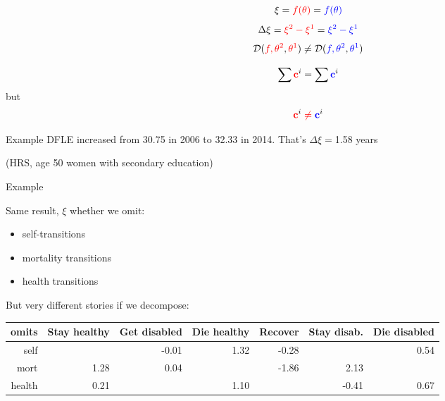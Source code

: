 \documentclass[20pt,usenames,dvipsnames]{beamer}
\begin{document}

\begin{frame}[plain]
\Large
$$\xi = \color{red}{f(\theta)} \color{black} = \color{blue}{f(\theta)}$$
\pause
$$ \Delta \xi = \color{red}{\xi^2 - \xi^1} \color{black} = \color{blue}{\xi^2 - \xi^1}$$
\pause
$$ \mathcal{D}(\color{red}{f}, \color{red}{\theta^2}\color{black},\color{red}{\theta^1}\color{black}) \ne \mathcal{D}(\color{blue}{f}, \color{blue}{\theta^2}\color{black},\color{blue}{\theta^1}\color{black})$$

$$ \sum \color{red}{\mathbf{c}}^{\color{black}i}\color{black} =\sum \color{blue}{\mathbf{c}}^{\color{black}i} $$
but
$$
\color{red}{\mathbf{c}}^{\color{black}i} \ne \color{blue}{\mathbf{c}}^{\color{black}i}$$
\end{frame}


\begin{frame}[plain]{Example}
\Large
DFLE increased from 30.75 in 2006 to 32.33 in 2014.
That's $\Delta \xi = $1.58 years

\bigskip
\bigskip
\small (HRS, age 50 women with secondary education)

\end{frame}

\begin{frame}[plain]{Example}

\Large
Same result, $\xi$  whether we omit:

\begin{itemize}
\item self-transitions
\item mortality transitions
\item health transitions
\end{itemize}

But very different stories if we decompose:

\normalsize
\begin{table}[ht]
\centering
\begin{tabular}{r|rrrrrr}
  \hline
omits & Stay healthy & Get disabled & Die healthy & Recover & Stay disab. & Die disabled \\ 
  \hline
self &  & -0.01 & 1.32 & -0.28 &  & 0.54 \\ 
  mort & 1.28 & 0.04 &  & -1.86 & 2.13 &  \\ 
  health & 0.21 &  & 1.10 &  & -0.41 & 0.67 \\ 
   \hline
\end{tabular}
\end{table}
\end{frame}
\end{document}
